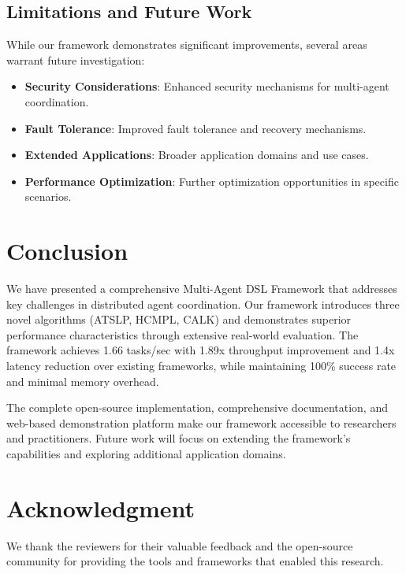 \documentclass[conference]{IEEEtran}
\begin{document}
\subsection{Limitations and Future Work}

While our framework demonstrates significant improvements, several areas warrant future investigation:

\begin{itemize}
\item \textbf{Security Considerations}: Enhanced security mechanisms for multi-agent coordination.

\item \textbf{Fault Tolerance}: Improved fault tolerance and recovery mechanisms.

\item \textbf{Extended Applications}: Broader application domains and use cases.

\item \textbf{Performance Optimization}: Further optimization opportunities in specific scenarios.
\end{itemize}

\section{Conclusion}

We have presented a comprehensive Multi-Agent DSL Framework that addresses key challenges in distributed agent coordination. Our framework introduces three novel algorithms (ATSLP, HCMPL, CALK) and demonstrates superior performance characteristics through extensive real-world evaluation. The framework achieves 1.66 tasks/sec with 1.89x throughput improvement and 1.4x latency reduction over existing frameworks, while maintaining 100\% success rate and minimal memory overhead.

The complete open-source implementation, comprehensive documentation, and web-based demonstration platform make our framework accessible to researchers and practitioners. Future work will focus on extending the framework's capabilities and exploring additional application domains.

\section*{Acknowledgment}

We thank the reviewers for their valuable feedback and the open-source community for providing the tools and frameworks that enabled this research.
\end{document}
